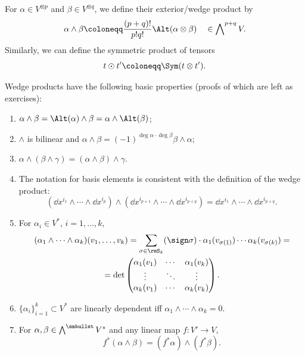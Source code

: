 \begin{defn}\label{def exterior and sym product}
    For $\alpha\in V^{\otimes p}$ and $\beta\in V^{\otimes q}$, we define their exterior/wedge product by
    \[\alpha\wedge\beta\coloneqq\frac{(p+q)!}{p!q!}\Alt (\alpha\otimes \beta)\quad \in \bigwedge\nolimits^{p+q}V.\]
    Similarly, we can define the symmetric product of tensors 
    \[t\odot t'\coloneqq\Sym(t\otimes t').\]
\end{defn}
Wedge products have the following basic properties (proofs of which are left as exercises):
\begin{enumerate}
    \item $\alpha\wedge\beta=\Alt(\alpha)\wedge\beta=\alpha\wedge\Alt(\beta)$;
    \item $\wedge$ is bilinear and $\alpha\wedge\beta=(-1)^{\deg\alpha\cdot\deg\beta}\beta\wedge\alpha$;
    \item $\alpha\wedge(\beta\wedge\gamma)=(\alpha\wedge\beta)\wedge\gamma$.
    \item The notation for basis elements is consistent with the definition of the wedge product:
    \[(\dd x^{i_1}\wedge\cdots\wedge \dd x^{i_p})\wedge (\dd x^{i_{p+1}}\wedge\cdots\wedge \dd x^{i_{p+q}})=\dd x^{i_1}\wedge\cdots\wedge \dd x^{i_{p+q}}.\]
    \item For $\alpha_i\in V^\ast$, $i=1,\ldots,k$, 
    \begin{multline}
        (\alpha_1\wedge\cdots\wedge\alpha_k)(v_1,\ldots,v_k)=\sum_{\sigma\in \rmS_k}(\sign\sigma)\cdot \alpha_1(v_{\sigma(1)})\cdots\alpha_k(v_{\sigma(k)})=\\
        =\det \begin{pmatrix}
         \alpha_1(v_1) & \cdots & \alpha_1(v_k)  \\
         \vdots & \ddots & \vdots \\
         \alpha_k(v_1) & \cdots & \alpha_k(v_k) 
    \end{pmatrix}.\label{form determinant f-la}
    \end{multline}
    \item $\{\alpha_i\}_{i=1}^k\subset V^\ast$ are linearly dependent iff $\alpha_1\wedge\cdots\wedge\alpha_k=0$.
    \item For $\alpha,\beta\in\bigwedge\nolimits^{\smbullet } V^\ast$ and any linear map $f:V'\to V$,
    \[f^\ast(\alpha\wedge\beta)=(f^\ast\alpha)\wedge(f^\ast\beta).\label{pullbacks of wedges}\]
\end{enumerate}

